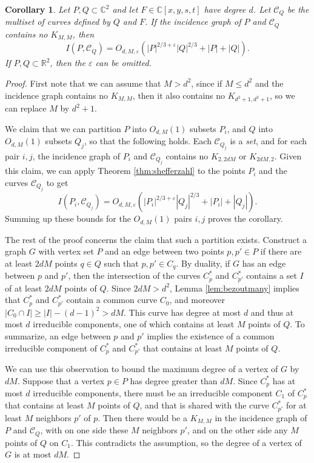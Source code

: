 \documentclass{daj}
\newtheorem{corollary}[theorem]{Corollary}
\theoremstyle{definition}
\newcommand{\C}{\mathbb C}
\newcommand{\R}{\mathbb R}
\newcommand{\cvs}{\mathcal C}
\newcommand{\eps}{\varepsilon}
\begin{document}
\begin{corollary}\label{cor:noKMM}
Let $P,Q\subset \C^2$ and let $F\in \C[x,y,s,t]$ have degree $d$.
Let $\mathcal{C}_Q$ be the multiset of curves defined by $Q$ and $F$.
If the incidence graph of $P$ and $ \mathcal{C}_Q$ contains no $K_{M,M}$, then
\[I(P,\mathcal{C}_Q) = O_{d,M,\eps}\left(|P|^{2/3+\eps}|Q|^{2/3}+|P|+|Q|\right).\]
If $P,Q\subset \R^2$, then the $\eps$ can be omitted.
\end{corollary}
\begin{proof}
First note that we can assume that $M>d^2$, since if $M\leq d^2$ and the incidence graph contains no $K_{M,M}$, then it also contains no $K_{d^2+1,d^2+1}$, so we can replace $M$ by $d^2+1$.

We claim that we can partition $P$ into $O_{d,M}(1)$ subsets $P_i$, and $Q$ into $O_{d,M}(1)$ subsets $Q_j$, so that the following holds.
Each $\cvs_{Q_j}$ is a \emph{set}, 
and for each pair $i,j$, the incidence graph of $P_i$ and $\cvs_{Q_j}$ contains no $K_{2,2dM}$ or $K_{2dM,2}$.
Given this claim, we can apply Theorem \ref{thm:shefferzahl} to the points $P_i$ and the curves $\cvs_{Q_j}$ to get
\[I(P_i,\cvs_{Q_j}) = O_{d,M,\eps}\left(|P_i|^{2/3+\eps}|Q_j|^{2/3}+|P_i|+|Q_j|\right). \]
Summing up these bounds for the $O_{d,M}(1)$ pairs $i,j$ proves the corollary.

The rest of the proof concerns the claim that such a partition exists.
Construct a graph $G$ with vertex set $P$ and an edge between two points $p,p'\in P$ if there are at least $2dM$ points $q\in Q$ such that $p,p'\in C_q$.
By duality, 
if $G$ has an edge between $p$ and $p'$,
then the intersection of the curves $C_p^*$ and $C_{p'}^*$ contains a set $I$ of at least $2dM$ points of $Q$.
Since $2dM>d^2$, Lemma \ref{lem:bezoutmany} implies that $C_p^*$ and $C_{p'}^*$ contain a common curve $C_0$, and moreover $|C_0\cap I|\geq |I| - (d-1)^2 > dM$.
This curve has degree at most $d$ and thus at most $d$ irreducible components, one of which contains at least $M$ points of $Q$.
To summarize, an edge between $p$ and $p'$ implies the existence of a common irreducible component of $C_p^*$ and $C_{p'}^*$ that contains at least $M$ points of $Q$.

We can use this observation to bound the maximum degree of a vertex of $G$ by $dM$.
Suppose that a vertex $p\in P$ has degree greater than $dM$.
Since $C_p^*$ has at most $d$ irreducible components, there must be an irreducible component $C_1$ of $C_p^*$ that contains at least $M$ points of $Q$, and that is shared with the curve $C_{p'}^*$ for at least $M$ neighbors $p'$ of $p$.
Then there  would be a $K_{M,M}$ in the incidence graph of $P$ and $\cvs_Q$, with on one side these $M$ neighbors $p'$, and on the other side any $M$ points of $Q$ on $C_1$.
This contradicts the assumption, so the degree of a vertex of $G$ is at most $dM$.


\end{proof}
\end{document}
